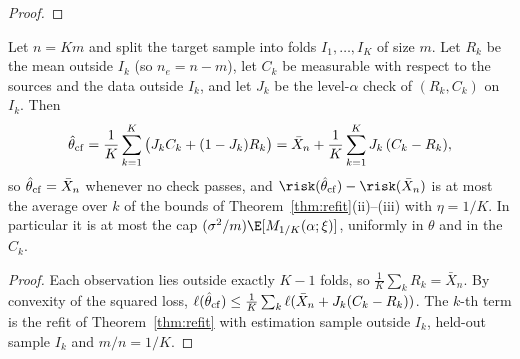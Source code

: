 \begin{proof}
\end{proof}

\begin{corollary}\label{cor:crossfit}
Let $n=Km$ and split the target sample into folds $I_1,\dots,I_K$ of size $m$. Let $R_k$ be the mean outside $I_k$ (so $n_e=n-m$), let $C_k$ be measurable with respect to the sources and the data outside $I_k$, and let $J_k$ be the level-$\alpha$ check of $(R_k,C_k)$ on $I_k$. Then
\[
\hat\theta_{\rm cf}=\frac1K\sum_{k=1}^K\big(J_kC_k+(1-J_k)R_k\big)=\bar X_n+\frac1K\sum_{k=1}^KJ_k\,(C_k-R_k),
\]
so $\hat\theta_{\rm cf}=\bar X_n$ whenever no check passes, and $\risk(\hat\theta_{\rm cf})-\risk(\bar X_n)$ is at most the average over $k$ of the bounds of Theorem~\ref{thm:refit}(ii)--(iii) with $\eta=1/K$. In particular it is at most the cap $(\sigma^2/m)\E[M_{1/K}(\alpha;\xi)]$, uniformly in $\theta$ and in the $C_k$. 
\end{corollary}
\begin{proof}
Each observation lies outside exactly $K-1$ folds, so $\frac1K\sum_kR_k=\bar X_n$. By convexity of the squared loss, $\ell(\hat\theta_{\rm cf})\le\frac1K\sum_k\ell(\bar X_n+J_k(C_k-R_k))$. The $k$-th term is the refit of Theorem~\ref{thm:refit} with estimation sample outside $I_k$, held-out sample $I_k$ and $m/n=1/K$.
\end{proof}

